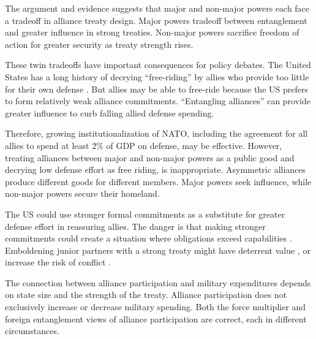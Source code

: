 \documentclass[12pt]{article}
\begin{document}
The argument and evidence suggests that major and non-major powers each face a tradeoff in alliance treaty design. 
Major powers tradeoff between entanglement and greater influence in strong treaties. 
Non-major powers sacrifice freedom of action for greater security as treaty strength rises. 


These twin tradeoffs have important consequences for policy debates.
The United States has a long history of decrying ``free-riding'' by allies who provide too little for their own defense \citep{Lanoszka2015}. 
But allies may be able to free-ride because the US prefers to form relatively weak alliance commitments. 
``Entangling alliances'' can provide greater influence to curb falling allied defense spending. 

 
Therefore, growing institutionalization of NATO, including the agreement for all allies to spend at least 2\% of GDP on defense, may be effective. 
However, treating alliances between major and non-major powers as a public good and decrying low defense effort as free riding, is inappropriate. 
Asymmetric alliances produce different goods for different members. 
Major powers seek influence, while non-major powers secure their homeland. 


The US could use stronger formal commitments as a substitute for greater defense effort in reassuring allies.
The danger is that making stronger commitments could create a situation where obligations exceed capabilities \citep{Kennedy1987}. 
Emboldening junior partners with a strong treaty might have deterrent value \citep{Bensonetal2014}, or increase the risk of conflict \citep{Benson2012}. 

 
The connection between alliance participation and military expenditures depends on state size and the strength of the treaty.  
Alliance participation does not exclusively increase or decrease military spending.  
Both the force multiplier and foreign entanglement views of alliance participation are correct, each in different circumstances. 




\singlespace
 
 
\end{document}
